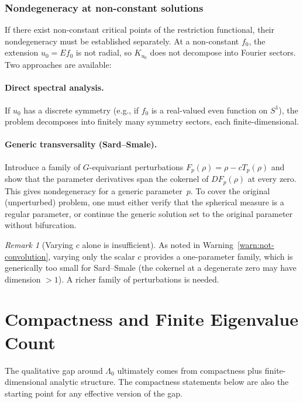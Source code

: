 \documentclass[12pt]{article}
\theoremstyle{definition}
\theoremstyle{remark}
\newtheorem{remark}[theorem]{Remark}
\begin{document}
\subsubsection{Nondegeneracy at non-constant solutions}
\label{sec:nondeg-nonconst}

If there exist non-constant critical points of the restriction functional,
their nondegeneracy must be established separately.  At a non-constant
$f_0$, the extension $u_0=Ef_0$ is not radial, so $K_{u_0}$ does not
decompose into Fourier sectors.  Two approaches are available:

\paragraph{Direct spectral analysis.}
If $u_0$ has a discrete symmetry (e.g., if $f_0$ is a real-valued
even function on $S^1$), the problem decomposes into finitely many
symmetry sectors, each finite-dimensional.

\paragraph{Generic transversality (Sard--Smale).}
Introduce a family of $G$-equivariant perturbations $F_p(\rho)=\rho-cT_p(\rho)$
and show that the parameter derivatives span the cokernel of $DF_p(\rho)$
at every zero.  This gives nondegeneracy for a generic parameter~$p$.
To cover the original (unperturbed) problem, one must either verify that
the spherical measure is a regular parameter, or continue the generic
solution set to the original parameter without bifurcation.

\begin{remark}[Varying $c$ alone is insufficient]
  As noted in Warning~\ref{warn:not-convolution}, varying only the scalar
  $c$ provides a one-parameter family, which is generically too small for
  Sard--Smale (the cokernel at a degenerate zero may have dimension
  $>1$).  A richer family of perturbations is needed.
\end{remark}



\section{Compactness and Finite Eigenvalue Count}
\label{sec:finite-count}

The qualitative gap around $\Lambda_0$ ultimately comes from compactness
plus finite-dimensional analytic structure.  The compactness statements
below are also the starting point for any effective version of the gap.
\end{document}
